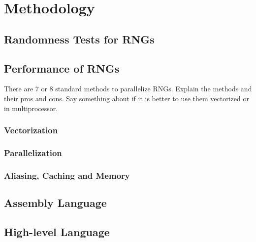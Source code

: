 \documentclass[crop=false]{standalone}
\begin{document}
  \section{Methodology} %
  \label{sec:methodology}
    \subsection{Randomness Tests for RNGs} %
    \label{sub:randomness_tests_for_rngs}


    \subsection{Performance of RNGs} %
    \label{sub:performance_of_rngs}
      There are 7 or 8 standard methods to parallelize RNGs.
      Explain the methods and their pros and cons.
      Say something about if it is better to use them vectorized or in multiprocessor.

      \subsubsection{Vectorization} %
      \label{ssub:vectorization}

      \subsubsection{Parallelization} %
      \label{ssub:parallelization}

      \subsubsection{Aliasing, Caching and Memory} %
      \label{ssub:aliasing_caching_and_memory}


    \subsection{Assembly Language} %
    \label{sub:assembly_language}


    \subsection{High-level Language} %
    \label{sub:high_level_language}
\end{document}
